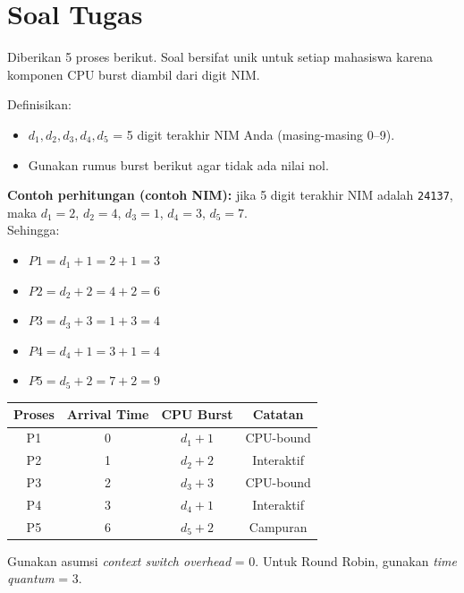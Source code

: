 \documentclass[12pt,a4paper]{article}
\begin{document}
\section{Soal Tugas}
Diberikan 5 proses berikut. Soal bersifat unik untuk setiap mahasiswa karena komponen CPU burst diambil dari digit NIM.

Definisikan:
\begin{itemize}
    \item $d_1, d_2, d_3, d_4, d_5$ = 5 digit terakhir NIM Anda (masing-masing 0--9).
    \item Gunakan rumus burst berikut agar tidak ada nilai nol.
\end{itemize}
\noindent
\textbf{Contoh perhitungan (contoh NIM):} jika 5 digit terakhir NIM adalah \texttt{24137}, maka
$d_1=2$, $d_2=4$, $d_3=1$, $d_4=3$, $d_5=7$.\\
Sehingga:
\begin{itemize}
    \item $P1 = d_1 + 1 = 2 + 1 = 3$
    \item $P2 = d_2 + 2 = 4 + 2 = 6$
    \item $P3 = d_3 + 3 = 1 + 3 = 4$
    \item $P4 = d_4 + 1 = 3 + 1 = 4$
    \item $P5 = d_5 + 2 = 7 + 2 = 9$
\end{itemize}

\begin{center}
\begin{tabular}{|c|c|c|c|}
\hline
\textbf{Proses} & \textbf{Arrival Time} & \textbf{CPU Burst} & \textbf{Catatan} \\
\hline
P1 & 0 & $d_1 + 1$ & CPU-bound \\
P2 & 1 & $d_2 + 2$ & Interaktif \\
P3 & 2 & $d_3 + 3$ & CPU-bound \\
P4 & 3 & $d_4 + 1$ & Interaktif \\
P5 & 6 & $d_5 + 2$ & Campuran \\
\hline
\end{tabular}
\end{center}

Gunakan asumsi \textit{context switch overhead} = 0. Untuk Round Robin, gunakan \textit{time quantum} = 3.
\end{document}
